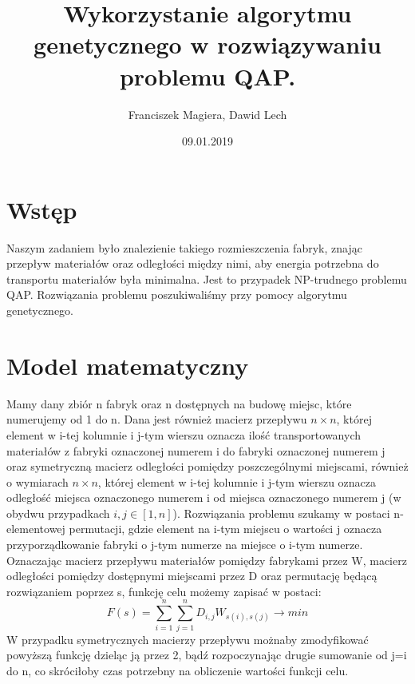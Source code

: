 \documentclass[12pt]{article}
\author{Franciszek Magiera, Dawid Lech}
\title{Wykorzystanie algorytmu genetycznego w rozwiązywaniu problemu QAP.}
\date{09.01.2019}
\begin{document}
\sloppy
\maketitle
\newpage
\tableofcontents
\newpage
\section{Wstęp}
Naszym zadaniem było znalezienie takiego rozmieszczenia fabryk, znając przepływ materiałów oraz odległości między nimi, aby energia potrzebna do transportu materiałów była minimalna. Jest to przypadek NP-trudnego problemu QAP. Rozwiązania problemu poszukiwaliśmy przy pomocy algorytmu genetycznego.
\section{Model matematyczny}
Mamy dany zbiór n fabryk oraz n dostępnych na budowę miejsc, które numerujemy od 1 do n. Dana jest również macierz przepływu $n\times n$, której element w i-tej kolumnie i j-tym wierszu oznacza ilość transportowanych materiałów z fabryki oznaczonej numerem i do fabryki oznaczonej numerem j oraz symetryczną macierz odległości pomiędzy poszczególnymi miejscami, również o wymiarach $n\times n$, której element w i-tej kolumnie i j-tym wierszu oznacza odległość miejsca oznaczonego numerem i od miejsca oznaczonego numerem j (w obydwu przypadkach $i,j \in [1,n]$). Rozwiązania problemu szukamy w postaci n-elementowej permutacji, gdzie element na i-tym miejscu o wartości j oznacza przyporządkowanie fabryki o j-tym numerze na miejsce o i-tym numerze. Oznaczając macierz przepływu materiałów pomiędzy fabrykami przez W, macierz odległości pomiędzy dostępnymi miejscami przez D oraz permutację będącą rozwiązaniem poprzez s, funkcję celu możemy zapisać w postaci:
\begin{equation}
F(s) = \sum_{i=1}^{n}  \sum_{j=1}^{n}D_{i,j}W_{s(i), s(j)} \longrightarrow min \label{Funkcja celu}
\end{equation}
W przypadku symetrycznych macierzy przepływu możnaby zmodyfikować powyższą funkcję dzieląc ją przez 2, bądź rozpoczynając drugie sumowanie od j=i do n, co skróciłoby czas potrzebny na obliczenie wartości funkcji celu.
\end{document}
